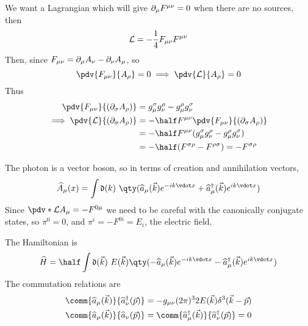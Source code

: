 We want a Lagrangian which will give $\partial_{\mu} F^{\mu \nu}=0$ when
there are no sources, then
\begin{equation}
  \label{eq:117}
\mathcal{L} = - \frac{1}{4} F_{\mu \nu} F^{\mu \nu}
\end{equation}
Then, since $F_{\mu \nu}= \partial_{\mu} A_{\nu} - \partial_{\nu} A_{\mu}$, so
\[ \pdv{F_{\mu \nu}}{A_\rho}=0 \implies \pdv{\Lag}{A_{\rho}} = 0 \]
Thus
\begin{align*}
  \pdv{F_{\mu \nu}}{(\partial_{\sigma} A_{\rho})} &= g_{\mu}^{\sigma}g_{\nu}^{\rho}-g_{\mu}^{\rho}g_{\nu}^{\sigma} \\
\implies \pdv{\Lag}{(\partial_{\sigma} A_{\rho})} &= - \half F^{\mu \nu} \pdv{F_{\mu \nu}}{(\partial_{\sigma} A_{\rho})} \\ &= - \half F^{\mu \nu} ( g_{\mu}^{\sigma}g_{\nu}^{\rho}-g_{\mu}^{\rho}g_{\nu}^{\sigma}) \\
&= - \half (F^{\sigma \rho} - F^{\rho \sigma}) = - F^{\sigma \rho}
\end{align*}

The photon is a vector boson, so in terms of creation and annihilation
vectors,
\begin{equation}
  \label{eq:118}
\Op{A}_{\mu}(x) = \int \nm{k} \qty( \Op{a}_{\mu}(\vec{k}) e^{-ik \vdot x} + \hOp{a}_{\mu}(\vec{k}) e^{ik \vdot x})
\end{equation}
Since $\pdv*{\Lag}{A_{\mu}}=-F^{0 \mu}$ we need to be careful with the
canonically conjugate states, so $\pi^0=0$, and $\pi^i = -F^{0i}=E_i$,
the electric field.

The Hamiltonian is
\begin{equation}
  \label{eq:119}
\Op{H} = \half \int \nm{\vec{k}} E(\vec{k})  \qty( - \Op{a}_{\mu}(\vec{k}) e^{-ik \vdot x} - \hOp{a}_{\mu}(\vec{k}) e^{ik \vdot x})
\end{equation}
The commutation relations are 
\begin{subequations}
  \begin{align}
    \comm{\Op{a}_{\mu}(\vec{k})}{\hOp{a}_{\nu}(\vec{p})} &= - g_{\mu \nu} (2 \pi)^3 2 E(\vec{k}) \delta^3(\vec{k}-\vec{p}) \\
\comm{\Op{a}_{\mu}(\vec{k})}{\Op{a}_{\nu}(\vec{p})} &= \comm{\hOp{a}_{\mu}(\vec{k})}{\hOp{a}_{\nu}(\vec{p})} = 0
  \end{align}
\end{subequations}

